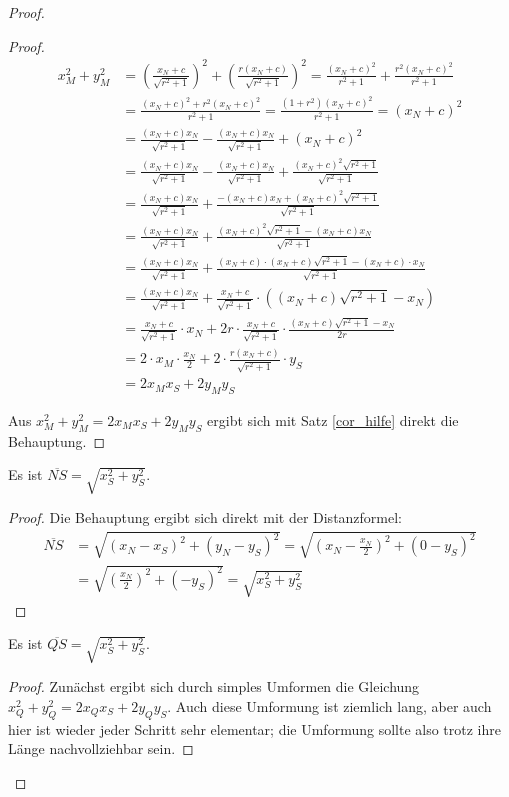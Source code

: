\begin{proof}
\begin{proof}
        \begin{align*}
            x_M^2+y_M^2&=\left(\frac{x_N+c}{\sqrt{r^2+1}}\right)^2+\left(\frac{r(x_N+c)}{\sqrt{r^2+1}}\right)^2
            =\frac{(x_N+c)^2}{r^2+1}+\frac{r^2(x_N+c)^2}{r^2+1}\\
            &=\frac{(x_N+c)^2+r^2(x_N+c)^2}{r^2+1}=\frac{(1+r^2)(x_N+c)^2}{r^2+1}=(x_N+c)^2\\
            &=\frac{(x_N+c)x_N}{\sqrt{r^2+1}}-\frac{(x_N+c)x_N}{\sqrt{r^2+1}}+(x_N+c)^2\\
            &=\frac{(x_N+c)x_N}{\sqrt{r^2+1}}-\frac{(x_N+c)x_N}{\sqrt{r^2+1}}+\frac{(x_N+c)^2\sqrt{r^2+1}}{\sqrt{r^2+1}}\\
            &=\frac{(x_N+c)x_N}{\sqrt{r^2+1}}+\frac{-(x_N+c)x_N+(x_N+c)^2\sqrt{r^2+1}}{\sqrt{r^2+1}}\\
            &=\frac{(x_N+c)x_N}{\sqrt{r^2+1}}+\frac{(x_N+c)^2\sqrt{r^2+1}-(x_N+c)x_N}{\sqrt{r^2+1}}\\
            &=\frac{(x_N+c)x_N}{\sqrt{r^2+1}}+\frac{(x_N+c)\cdot(x_N+c)\sqrt{r^2+1}-(x_N+c)\cdot x_N}{\sqrt{r^2+1}}\\
            &=\frac{(x_N+c)x_N}{\sqrt{r^2+1}}+\frac{x_N+c}{\sqrt{r^2+1}}\cdot \left((x_N+c)\sqrt{r^2+1}-x_N\right)\\
            &=\frac{x_N+c}{\sqrt{r^2+1}}\cdot x_N+2r\cdot\frac{x_N+c}{\sqrt{r^2+1}}\cdot\frac{(x_N+c)\sqrt{r^2+1}-x_N}{2r}\\
            &=2\cdot x_M\cdot\frac{x_N}{2}+2\cdot\frac{r(x_N+c)}{\sqrt{r^2+1}}\cdot y_S\\
            &=2x_Mx_S+2y_My_S
        \end{align*}

        Aus $x_M^2+y_M^2=2x_Mx_S+2y_My_S$ ergibt sich mit Satz \ref{cor_hilfe} direkt die Behauptung.
    \end{proof}
    \begin{lem}\label{dumm_N}
        Es ist $\overline{NS}=\sqrt{x_S^2+y_S^2}$.
    \end{lem}
    \begin{proof}
        Die Behauptung ergibt sich direkt mit der Distanzformel:
        \begin{align*}
            \overline{NS}&=\sqrt{(x_N-x_S)^2+(y_N-y_S)^2}=\sqrt{\left(x_N-\frac{x_N}{2}\right)^2+(0-y_S)^2}\\
            &=\sqrt{\left(\frac{x_N}{2}\right)^2+(-y_S)^2}=\sqrt{x_S^2+y_S^2}
        \end{align*}
    \end{proof}
    \begin{lem}\label{dumm_Q}
        Es ist $\overline{QS}=\sqrt{x_S^2+y_S^2}$.
    \end{lem}
    \begin{proof}
        Zunächst ergibt sich durch simples Umformen die Gleichung $x_Q^2+y_Q^2=2x_Qx_S+2y_Qy_S$. Auch diese 
        Umformung ist ziemlich lang, aber auch hier ist wieder jeder Schritt sehr elementar; die Umformung sollte 
        also trotz ihre Länge nachvollziehbar sein.


\end{proof}
\end{proof}

